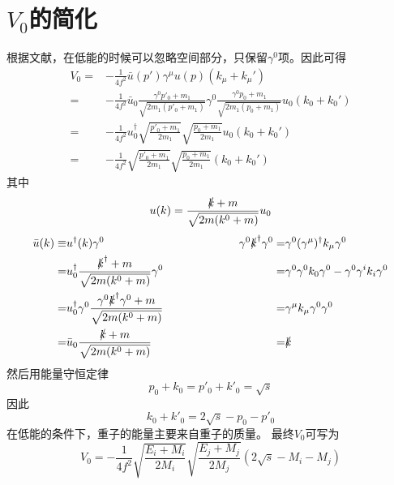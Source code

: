 \section{$V_{0}$的简化}
根据文献\cite{OSET199899}，在低能的时候可以忽略空间部分，只保留$\gamma^{0}$项。因此可得
\begin{equation}
\begin{split}
	V_{0}=&-\frac{1}{4f^2}\bar{u}(p')\gamma^{\mu}u(p)(k_{\mu}+k_{\mu}')\\
	=&-\frac{1}{4f^2}\bar{u}_{0}\frac{\gamma^{0}p'_{0}+m_{1}}{\sqrt{2m_{1}(p'_{0}+m_{1})}}\gamma^{0}\frac{\gamma^{0}p_{0}+m_{1}}{\sqrt{2m_{1}(p_{0}+m_{1})}}u_{0}(k_{0}+k_{0}')\\
	=&-\frac{1}{4f^2}u^{\dagger}_{0}\sqrt{\frac{p'_{0}+m_{1}}{2m_{1}}}\sqrt{\frac{p_{0}+m_{1}}{2m_{1}}}u_{0}(k_{0}+k_{0}')\\
	=&-\frac{1}{4f^2}\sqrt{\frac{p'_{0}+m_{1}}{2m_{1}}}\sqrt{\frac{p_{0}+m_{1}}{2m_{1}}}(k_{0}+k_{0}')
\end{split}
\end{equation}
其中
\begin{equation*}
	u(k)=\frac{\slashed{k}+m}{\sqrt{2m(k^{0}+m)}}u_{0}
\end{equation*}
\begin{equation*}
\begin{aligned}
	\bar{u}(k)\equiv&u^{\dagger}(k)\gamma^{0}&\hspace{2cm}\gamma^{0}\slashed{k}^{\dagger}\gamma^{0}=&\gamma^{0}(\gamma^{\mu})^{\dagger}k_{\mu}\gamma^{0}\\
	=&u_{0}^{\dagger}\frac{\slashed{k}^{\dagger}+m}{\sqrt{2m(k^{0}+m)}}\gamma^{0}&=&\gamma^{0}\gamma^{0}k_{0}\gamma^{0}-\gamma^{0}\gamma^{i}k_{i}\gamma^{0}\\
	=&u_{0}^{\dagger}\gamma^{0}\frac{\gamma^{0}\slashed{k}^{\dagger}\gamma^{0}+m}{\sqrt{2m(k^{0}+m)}}&=&\gamma^{\mu}k_{\mu}\gamma^{0}\gamma^{0}\\
	=&\bar{u}_{0}\frac{\slashed{k}+m}{\sqrt{2m(k^{0}+m)}}&=&\slashed{k}
\end{aligned}
\end{equation*}
然后用能量守恒定律
\begin{equation}
	p_{0}+k_{0}=p'_{0}+k'_{0}=\sqrt{s}
\end{equation}
因此
\begin{equation}
	k_{0}+k'_{0}=2\sqrt{s}-p_{0}-p'_{0}
\end{equation}
在低能的条件下，重子的能量主要来自重子的质量。
最终$V_{0}$可写为
\begin{equation}
	V_{0}=-\frac{1}{4f^2}\sqrt{\frac{E_{i}+M_{i}}{2M_{i}}}\sqrt{\frac{E_{j}+M_{j}}{2M_{j}}}(2\sqrt{s}-M_{i}-M_{j})
\end{equation}

